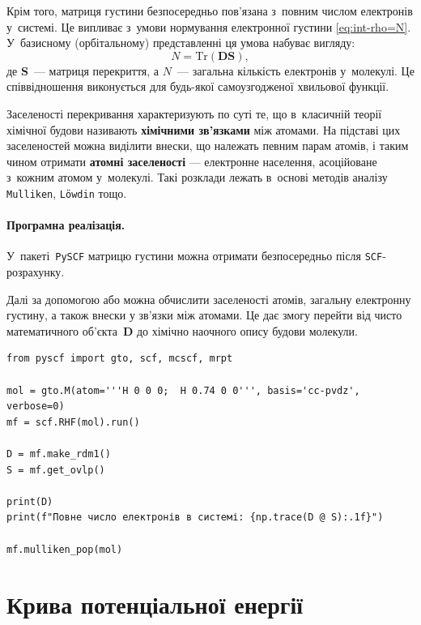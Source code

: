 Крім того, матриця густини безпосередньо пов’язана з~повним числом електронів у~системі.
Це випливає з~умови нормування електронної густини \eqref{eq:int-rho=N}.
У~базисному (орбітальному) представленні ця умова набуває вигляду:
\[
	N = \mathrm{Tr}(\mathbf{D}\mathbf{S}),
\]
де $\mathbf{S}$~--- матриця перекриття, а $N$~--- загальна кількість електронів у~молекулі.
Це співвідношення виконується для будь-якої самоузгодженої хвильової функції.

Заселеності перекривання характеризують по суті те,
що в~класичній теорії хімічної будови
називають \textbf{хімічними зв’язками} між атомами.
На підставі цих заселеностей можна виділити внески,
що належать певним парам атомів,
і таким чином отримати \textbf{атомні заселеності} ---
електронне населення, асоційоване з~кожним атомом у~молекулі.
Такі розклади лежать в~основі методів аналізу \texttt{Mulliken}, \texttt{Löwdin} тощо.

\paragraph{Програмна реалізація.}
У~пакеті~\texttt{PySCF} матрицю густини можна отримати
безпосередньо після \texttt{SCF}-розрахунку.

Далі за допомогою  або
 можна обчислити заселеності атомів,
загальну електронну густину, а також внески у зв’язки між атомами.
Це дає змогу перейти від чисто математичного об’єкта~$\mathbf{D}$
до хімічно наочного опису будови молекули.

\begin{verbatim}
from pyscf import gto, scf, mcscf, mrpt

mol = gto.M(atom='''H 0 0 0;  H 0.74 0 0''', basis='cc-pvdz', verbose=0)
mf = scf.RHF(mol).run()

D = mf.make_rdm1()
S = mf.get_ovlp()

print(D)
print(f"Повне число електронів в системі: {np.trace(D @ S):.1f}")

mf.mulliken_pop(mol)
\end{verbatim}



\section{Крива потенціальної енергії}


